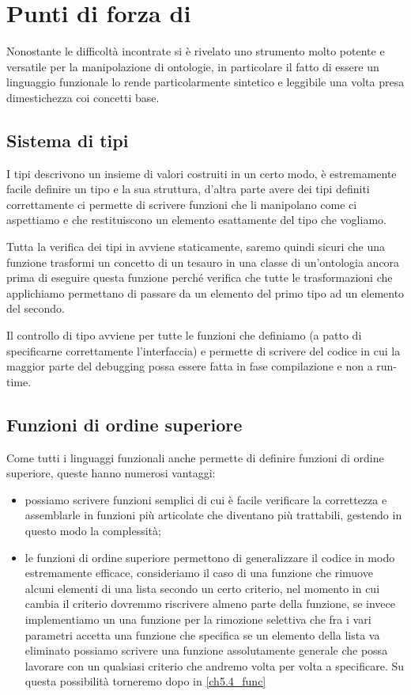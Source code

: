 \section{Punti di forza di \cduce}
Nonostante le difficoltà incontrate \cduce si è rivelato uno strumento molto potente e versatile per la manipolazione di ontologie, in particolare il fatto di essere un linguaggio funzionale lo rende particolarmente sintetico e leggibile una volta presa dimestichezza coi concetti base.
\subsection{Sistema di tipi}
I tipi descrivono un insieme di valori costruiti in un certo modo, è estremamente facile definire un tipo e la sua struttura, d'altra parte avere dei tipi definiti correttamente ci permette di scrivere funzioni che li manipolano come ci aspettiamo e che restituiscono un elemento esattamente del tipo che vogliamo.

Tutta la verifica dei tipi in \cduce avviene staticamente, saremo quindi sicuri che una funzione trasformi un concetto di un tesauro in una classe di un'ontologia ancora prima di eseguire questa funzione perché \cduce verifica che tutte le trasformazioni che applichiamo permettano di passare da un elemento del primo tipo ad un elemento del secondo.

Il controllo di tipo avviene per tutte le funzioni che definiamo (a patto di specificarne correttamente l'interfaccia) e permette di scrivere del codice in cui la maggior parte del debugging possa essere fatta in fase compilazione e non a run-time. 

\subsection{Funzioni di ordine superiore}
Come tutti i linguaggi funzionali anche \cduce permette di definire funzioni di ordine superiore, queste hanno numerosi vantaggi: 
\begin{itemize}
	\item possiamo scrivere funzioni semplici di cui è facile verificare la correttezza e assemblarle in funzioni più articolate che diventano più trattabili, gestendo in questo modo la complessità;
	\item le funzioni di ordine superiore permettono di generalizzare il codice in modo estremamente efficace, consideriamo il caso di una funzione che rimuove alcuni elementi di una lista secondo un certo criterio, nel momento in cui cambia il criterio dovremmo riscrivere almeno parte della funzione, se invece implementiamo un una funzione per la rimozione selettiva che fra i vari parametri accetta una funzione che specifica se un elemento della lista va eliminato possiamo scrivere una funzione assolutamente generale che possa lavorare con un qualsiasi criterio che andremo volta per volta a specificare. Su questa possibilità torneremo dopo in \ref{ch5.4_func}
\end{itemize}

